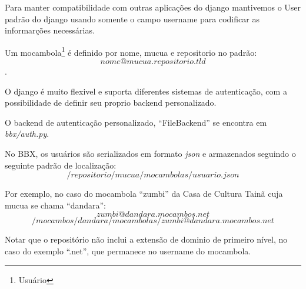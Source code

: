 Para manter compatibilidade com outras aplicações do django mantivemos
o User padrão do django usando somente o campo username para codificar
as informarções necessárias.

Um mocambola\footnote{Usuário} é definido por nome, mucua e
repositorio no padrão:
$$ nome@mucua.repositorio.tld $$ .

O django é muito flexivel e suporta diferentes sistemas de
autenticação, com a possibilidade de definir seu proprio backend
personalizado.

O backend de autenticação personalizado, ``FileBackend'' se encontra
em \emph{bbx/auth.py}.

No BBX, os usuários são serializados em formato \emph{json} e
armazenados seguindo o seguinte padrão de localização:
$$ /repositorio/mucua/mocambolas/usuario.json $$

Por exemplo, no caso do mocambola ``zumbi'' da Casa de Cultura
Tainã cuja mucua se chama ``dandara'':
$$ zumbi@dandara.mocambos.net $$
$$ /mocambos/dandara/mocambolas/zumbi@dandara.mocambos.net $$

Notar que o repositório não inclui a extensão de dominio de primeiro
nível, no caso do exemplo ``.net'', que permanece no username do
mocambola.


